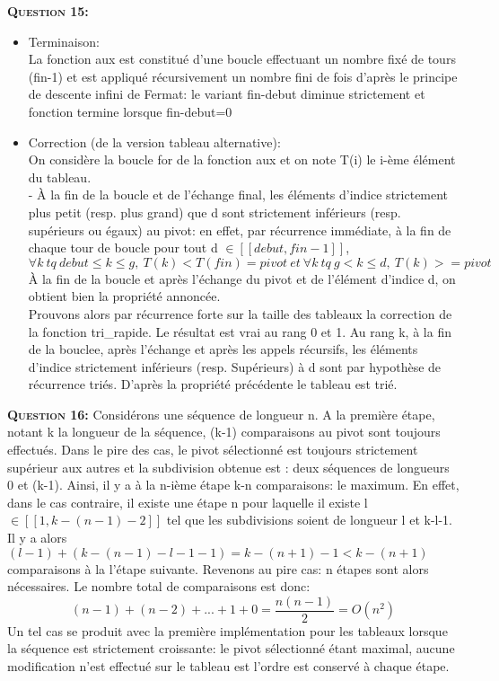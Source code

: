 \documentclass{article}
\begin{document}
\textsc{\bfseries Question 15:}
\begin{itemize}
	\item Terminaison:\\
		La fonction aux est constitué d'une boucle effectuant un nombre fixé de tours (fin-1) et est appliqué récursivement un nombre fini de fois d'après le principe de descente infini de Fermat: le variant fin-debut diminue strictement et fonction termine lorsque fin-debut=0   
	\item Correction (de la version tableau alternative):\\
		On considère la boucle for de la fonction aux et on note T(i) le i-ème élément du tableau.\\
		- \`A la fin de la boucle et de l'échange final, les éléments d'indice strictement plus petit (resp. plus grand) que d sont strictement inférieurs (resp. supérieurs ou égaux) au pivot: en effet, par récurrence immédiate, à la fin de chaque tour de boucle pour tout d \(\in [\![debut,fin-1]\!]\),
		\[\forall k\ tq\ debut \leq k \leq g,\ T(k)<T(fin)=pivot\ et\ \forall k\ tq\ g < k \leq d,\ T(k)>=pivot\] 
		\`A la fin de la boucle et après l'échange du pivot et de l'élément d'indice d, on obtient bien la propriété annoncée.\\
		Prouvons alors par récurrence forte sur la taille des tableaux la correction de la fonction tri\_rapide. Le résultat est vrai au rang 0 et 1. Au rang k, à la fin de la bouclee, après l'échange et après les appels récursifs, les éléments d'indice strictement inférieurs (resp. Supérieurs) à d sont par hypothèse de récurrence triés. D'après la propriété précédente le tableau est trié. 	
\end{itemize}

\textsc{\bfseries Question 16:}
Considérons une séquence de longueur n. A la première étape, notant k la longueur de la séquence, (k-1) comparaisons au pivot sont toujours effectués. Dans le pire des cas, le pivot sélectionné est toujours strictement supérieur aux autres et la subdivision obtenue est : deux séquences de longueurs 0 et (k-1). Ainsi, il y a à la n-ième étape k-n comparaisons: le maximum. En effet, dans le cas contraire, il existe une étape n pour laquelle il existe l \(\in [\![1, k-(n-1)-2]\!]\) tel que les subdivisions soient de longueur l et k-l-1. Il y a alors \((l-1)+(k-(n-1)-l-1-1)=k-(n+1)-1 < k-(n+1)\) comparaisons à la l'étape suivante. Revenons au pire cas: n étapes sont alors nécessaires. Le nombre total de comparaisons est donc: 
	\[(n-1)+(n-2)+...+1+0=\frac{n(n-1)}{2}=O(n^{2})\]
Un tel cas se produit avec la première implémentation pour les tableaux lorsque la séquence est strictement croissante: le pivot sélectionné étant maximal, aucune modification n'est effectué sur le tableau est l'ordre est conservé à chaque étape.\\ 
\end{document}
